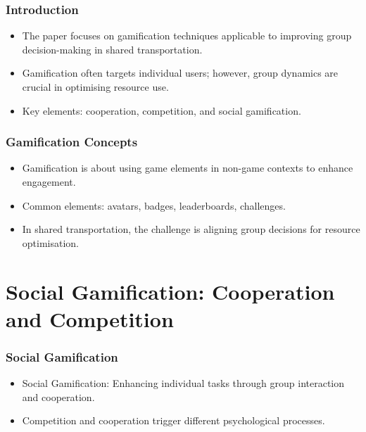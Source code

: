 \begin{frame}
    \frametitle{Introduction}
    \begin{itemize}
        \item The paper focuses on gamification techniques applicable to improving \alert{group decision-making} in shared transportation.
        \item Gamification often targets individual users; however, group dynamics are crucial in optimising resource use.
        \item Key elements: cooperation, competition, and social gamification.
    \end{itemize}
\end{frame}

\begin{frame}
    \frametitle{Gamification Concepts}
    \begin{itemize}
        \item \alert{Gamification} is about using game elements in non-game contexts to enhance engagement.
        \item Common elements: avatars, badges, leaderboards, challenges.
        \item In \alert{shared transportation}, the challenge is aligning group decisions for resource optimisation.
    \end{itemize}
\end{frame}

\section{Social Gamification: Cooperation and Competition}
\begin{frame}
    \frametitle{Social Gamification}
    \begin{itemize}
        \item \alert{Social} Gamification: Enhancing individual tasks through group interaction and cooperation.
        \item \alert{Competition and cooperation} trigger different psychological processes.
    \end{itemize}
\end{frame}

